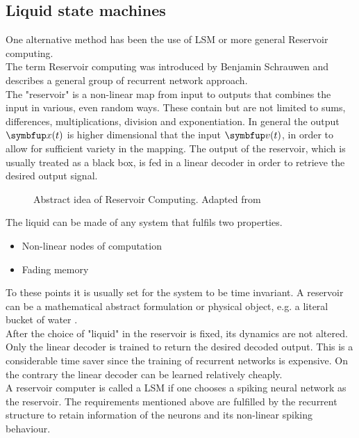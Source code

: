 \subsection{Liquid state machines}
One alternative method has been the use of \ac{LSM} or more general Reservoir computing.\\
The term Reservoir computing was introduced by Benjamin Schrauwen and describes a general group of recurrent network approach\cite{verstraeten_experimental_2007}.\\
The "reservoir" is a non-linear map from input to outputs that combines the input in various, even random ways. These contain but are not limited to sums, differences, multiplications, division and exponentiation. In general the output $\bmu{x}(t)$ is higher dimensional that the input $\bmu{v}(t)$, in order to allow for sufficient variety in the mapping. The output of the reservoir, which is usually treated as a black box, is fed in a linear decoder in order to retrieve the desired output signal.\\
\begin{figure}
	\centering
	
	\caption{Abstract idea of Reservoir Computing. Adapted from \cite{cooper_liquid_2011}}
	\label{fig:reservoir_computing}
\end{figure}
The liquid can be made of any system that fulfils two properties.\\
\begin{itemize}
	\item Non-linear nodes of computation
	\item Fading memory
\end{itemize}
To these points it is usually set for the system to be time invariant\cite{cooper_liquid_2011}.
A reservoir can be a mathematical abstract formulation or physical object, e.g. a literal bucket of water \cite{tanaka_recent_2019}.\\
After the choice of "liquid" in the reservoir is fixed, its dynamics are not altered. Only the linear decoder is trained to return the desired decoded output\cite{jaeger_echo_2010}. This is a considerable time saver since the training of recurrent networks is expensive. On the contrary the linear decoder can be learned relatively cheaply.\\
A reservoir computer is called a \ac{LSM} if one chooses a spiking neural network as the reservoir. The requirements mentioned above are fulfilled by the recurrent structure to retain information of the neurons and its non-linear spiking behaviour.\\
